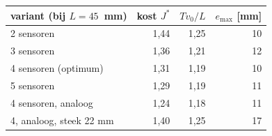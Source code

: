 \begin{tabular}{@{}lrrr@{}}
\toprule
variant (bij $L = 45$~mm) & kost $J^*$ & $T v_0/L$ & $e_{\max}$ [mm] \\
\midrule
2 sensoren & 1{,}44 & 1{,}25 & 10 \\
3 sensoren & 1{,}36 & 1{,}21 & 12 \\
4 sensoren (optimum) & 1{,}31 & 1{,}19 & 10 \\
5 sensoren & 1{,}29 & 1{,}19 & 11 \\
4 sensoren, analoog & 1{,}24 & 1{,}18 & 11 \\
4, analoog, steek 22 mm & 1{,}40 & 1{,}25 & 17 \\
\bottomrule
\end{tabular}
